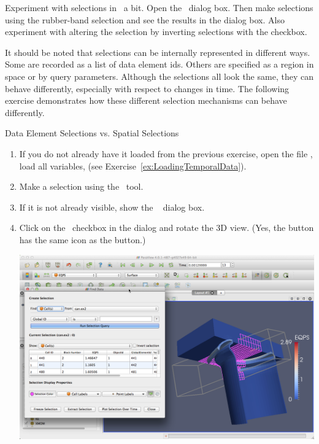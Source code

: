 Experiment with selections in ~\findData a bit.  Open the
~\findData dialog box.  Then make selections using the
rubber-band selection and see the results in the  dialog
box.  Also experiment with altering the selection by inverting selections
with the  checkbox.

It should be noted that selections can be internally represented in
different ways. Some are recorded as a list of data element ids. Others are
specified as a region in space or by query parameters. Although the
selections all look the same, they can behave differently, especially with
respect to changes in time. The following exercise demonstrates how these
different selection mechanisms can behave differently.

\begin{exercise}{Data Element Selections vs. Spatial Selections}
  \label{ex:DataElementSelectionsVsSpatialSelections}%
  \begin{enumerate}
  \item If you do not already have it loaded from the previous exercise,
    open the file , load all variables, \apply (see
    Exercise~\ref{ex:LoadingTemporalData}).
  \item Make a selection using the ~\selectCellsThrough tool.
  \item If it is not already visible, show the ~\findData
    dialog box.
  \item Click on the ~\selectCellsThrough checkbox in the
     dialog and rotate the 3D view. (Yes, the  button has the same icon as the 
    button.)

    \begin{inlinefig}
      \includegraphics[width=\scw]{images/SelectionFrustum}
    \end{inlinefig}


\end{enumerate}
\end{exercise}
